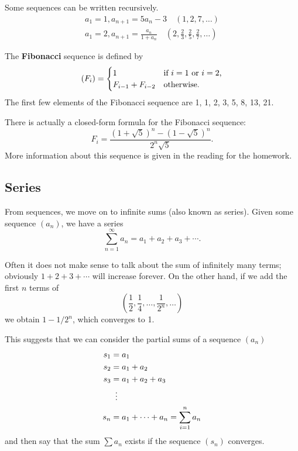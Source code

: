 Some sequences can be written recursively.
\begin{gather*}
  a_1 = 1, a_{n + 1} = 5a_n - 3 \quad (1, 2, 7, \dots)\\
  a_1 = 2, a_{n + 1} = \frac{a_n}{1 + a_n} \quad \left(2, \frac{2}{3}, \frac{2}{5}, \frac{2}{7}, \dots\right)
\end{gather*}

\begin{ex}
  The \textbf{Fibonacci} sequence is defined by
  \begin{displaymath}
    (F_i) = \begin{cases}
      1 & \text{if $ i = 1 $ or $ i = 2 $,}\\
      F_{i - 1} + F_{i - 2} & \text{otherwise.}
    \end{cases}
  \end{displaymath}
  The first few elements of the Fibonacci sequence are 1, 1, 2, 3, 5, 8, 13, 21.

  There is actually a closed-form formula for the Fibonacci sequence:
  \begin{displaymath}
    F_i = \frac{\left(1 + \sqrt{5}\right)^n - \left(1 - \sqrt{5}\right)^n}{2^n \sqrt{5}}.
  \end{displaymath}
  More information about this sequence is given in the reading for the homework.
\end{ex}

\subsection*{Series}
From sequences, we move on to infinite sums (also known as series). Given some sequence $ (a_n) $, we have a series
\begin{displaymath}
  \sum_{n = 1}^\infty a_n = a_1 + a_2 + a_3 + \cdots.
\end{displaymath}

Often it does not make sense to talk about the sum of infinitely many terms; obviously $ 1 + 2 + 3 + \cdots $ will increase
forever. On the other hand, if we add the first $ n $ terms of
\begin{displaymath}
  \left(\frac{1}{2}, \frac{1}{4}, \dots, \frac{1}{2^n}, \dots\right)
\end{displaymath}
we obtain $ 1 - 1/2^n $, which converges to 1.

This suggests that we can consider the partial sums of a sequence $ (a_n) $
\begin{align*}
  s_1 &= a_1\\
  s_2 &= a_1 + a_2\\
  s_3 &= a_1 + a_2 + a_3\\
      &\vdotswithin{=}\\
  s_n &= a_1 + \cdots + a_n = \sum_{i = 1}^n a_n
\end{align*}
and then say that the sum $ \sum a_n $ exists if the sequence $ (s_n) $ converges.

